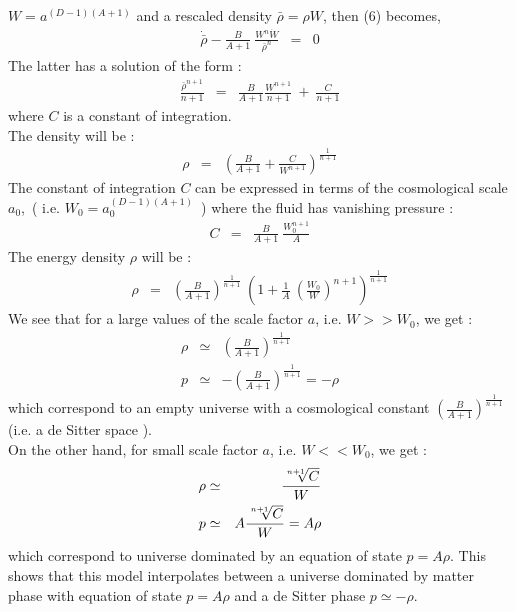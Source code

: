 \documentclass[a4paper,12pt,a4]{article}
\begin{document}
$W = a^{(D - 1) (A + 1)}$ and a rescaled density 
$\bar{\rho} = \rho W$, then (6) becomes, 
\begin{eqnarray}
\dot{\bar{\rho}} - \frac{B}{A + 1}~\frac{W^n \dot{W}}{\bar{\rho}^n} & = & 0 
\end{eqnarray} 
The latter has a solution of the form :  
\begin{eqnarray}
\frac{\bar{\rho}^{n+1}}{n + 1} & = & \frac{B}{A+1} \frac{W^{n+1}}{n+1}~ 
+~ \frac{C}{n+1}  
\end{eqnarray}
where $C$ is a constant of integration. \\
The density will be : 
\begin{eqnarray}
\rho & = & \left( \frac{B}{A+1} 
+ \frac{C}{W^{n+1}} \right)^{\frac{1}{n+1}} 
\end{eqnarray} 
The constant of integration $C$ can be expressed in terms of the 
cosmological scale $a_0$,~( i.e. $W_0 = a_0^{(D -1 )(A+1)}$~) 
where the fluid has vanishing pressure :  
\begin{eqnarray} 
C & = & \frac{B}{A+1}~ \frac{W_0^{n+1}}{A} 
\end{eqnarray} 
The energy density $\rho$ will be : 
\begin{eqnarray}
\rho & = & \left( \frac{B}{A+1} \right)^{\frac{1}{n+1}}~ \left( 1 + 
\frac{1}{A}~ \left( \frac{W_0}{W} \right)^{n+1} \right)^{\frac{1}{n+1}}  
\end{eqnarray} 
We see that for a large values of the scale factor $a$, i.e. 
$W >> W_0$, we get : 
\begin{eqnarray} 
\rho & \simeq & \left( {\frac{B}{A+1}} \right)^{\frac{1}{n+1}}  \nonumber \\
p & \simeq & - \left({\frac{B}{A+1}} \right)^{\frac{1}{n+1}} = - \rho 
\end{eqnarray} 
which correspond to an empty universe with a cosmological constant 
$\left( {\frac{B}{A+1}} \right)^{\frac{1}{n+1}}$ (i.e. a de Sitter space ). \\
On the other hand, for small scale factor $a$, 
i.e.  $W << W_0$, we get :  
\begin{eqnarray} 
\rho & \simeq & \frac{\root n+1 \of C}{W} \nonumber \\
p & \simeq & A \frac{\root n+1 \of C}{W} = A \rho 
\end{eqnarray} 
which correspond to universe dominated by an equation of state 
$p = A \rho$. This shows that this model interpolates between a universe 
dominated by matter phase with equation of state $p = A \rho$ and 
a de Sitter phase $p \simeq - \rho$. \\ 
\end{document}
